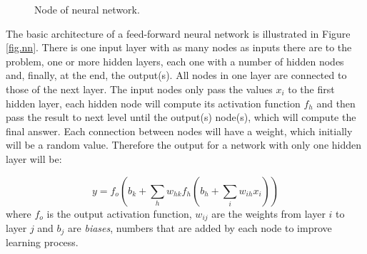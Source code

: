 \begin{figure}[!h]
	\centering
{}
	\caption{\label{fig.nnNode} Node of neural network.}
\end{figure}


The basic architecture of a feed-forward neural network is illustrated in Figure \ref{fig.nn}. There is one input layer with as many nodes as inputs there are to the problem, one or more hidden layers, each one with a number of hidden nodes and, finally, at the end, the output(s). All nodes in one layer are connected to those of the next layer. The input nodes only pass the values $x_i$ to the first hidden layer, each hidden node will compute its activation function $f_h$ and then pass the result to next level until the output(s) node(s), which will compute the final answer. Each connection between nodes will have a weight, which initially will be a random value. Therefore the output for a network with only one hidden layer will be:

$$ y = f_o \left(b_k + \sum_h w_{hk} f_h \left(b_h + \sum_i w_{ih}x_i\right) \right)$$
%
where $f_o$ is the output activation function, $w_{ij}$ are the weights from layer $i$ to layer $j$ and $b_j$ are {\it biases}, numbers that are added by each node to improve learning process.


